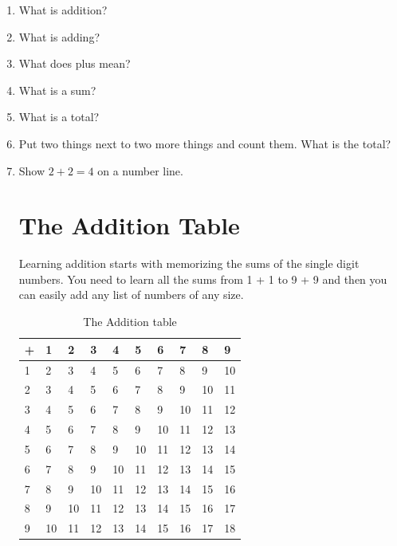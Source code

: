 \documentclass{article}
\begin{document}
\begin{enumerate}
\item What is addition?
\item What is adding?
\item What does plus mean?
\item What is a sum?
\item What is a total?
\item Put two things next to two more things and count them. What is the total?
\item Show $2+2=4$ on a number line.

\newpage

\section*{The Addition Table}
Learning addition starts with memorizing the sums of the single digit numbers. You need to learn all the sums from 1 + 1 to 9 + 9 and then you can easily add any list of numbers of any size.\\

\begin{table}[h]
\centering
\begin{tabular}{|l|l|l|l|l|l|l|l|l|l|}
\hline
+ & 1  & 2  & 3  & 4  & 5  & 6  & 7  & 8  & 9                       \\ \hline
1 & 2  & 3  & 4  & 5  & 6  & 7  & 8  & 9  & 10                      \\ \hline
2 & 3  & 4  & 5  & 6  & 7  & 8  & 9  & 10 & 11                      \\ \hline
3 & 4  & 5  & 6  & 7  & 8  & 9  & 10 & 11 & 12                      \\ \hline
4 & 5  & 6  & 7  & 8  & 9  & 10 & 11 & 12 & 13                      \\ \hline
5 & 6  & 7  & 8  & 9  & 10 & 11 & 12 & 13 & 14                      \\ \hline
6 & 7  & 8  & 9  & 10 & 11 & 12 & 13 & 14 & 15                      \\ \hline
7 & 8  & 9  & 10 & 11 & 12 & 13 & 14 & 15 & 16                      \\ \hline
8 & 9  & 10 & 11 & 12 & 13 & 14 & 15 & 16 & 17                      \\ \hline
9 & 10 & 11 & 12 & 13 & 14 & 15 & 16 & 17 & \multicolumn{1}{c|}{18} \\ \hline
\end{tabular}
\caption*{The Addition table}
\end{table}


\end{enumerate}
\end{document}

